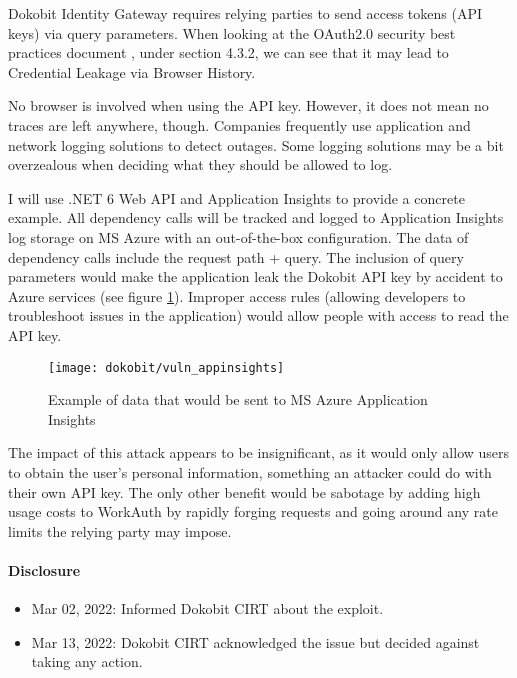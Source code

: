 Dokobit Identity Gateway requires {relying parties} to send access tokens (API keys) via query parameters. When looking at the OAuth2.0 security best practices document \cite{ietf-oauth-security-topics-19}, under section 4.3.2, we can see that it may lead to Credential Leakage via Browser History.

No browser is involved when using the API key. However, it does not mean no traces are left anywhere, though. Companies frequently use application and network logging solutions to detect outages. Some logging solutions may be a bit overzealous when deciding what they should be allowed to log.

I will use .NET 6 Web API and Application Insights to provide a concrete example. All dependency calls will be tracked and logged to Application Insights log storage on MS Azure with an out-of-the-box configuration. The data of dependency calls include the request path + query. The inclusion of query parameters would make the application leak the Dokobit API key by accident to Azure services (see figure \ref{fig:dokobit-vuln-query}). Improper access rules (allowing developers to troubleshoot issues in the application) would allow people with access to read the API key.

\begin{figure}
  \centering
  \texttt{[image: dokobit/vuln\_appinsights]}
  \caption{Example of data that would be sent to MS Azure Application Insights}
  \label{fig:dokobit-vuln-query}
\end{figure}

The impact of this attack appears to be insignificant, as it would only allow users to obtain the user's personal information, something an attacker could do with their own API key. The only other benefit would be sabotage by adding high usage costs to WorkAuth by rapidly forging requests and going around any rate limits the relying party may impose.

\paragraph{Disclosure}

\begin{itemize}
  \item Mar 02, 2022: Informed Dokobit CIRT about the exploit.
  \item Mar 13, 2022: Dokobit CIRT acknowledged the issue but decided against taking any action.
\end{itemize}


